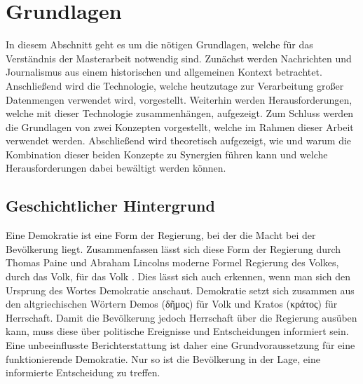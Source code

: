\section{Grundlagen}
In diesem Abschnitt geht es um die nötigen Grundlagen, welche für das Verständnis der Masterarbeit notwendig sind.
Zunächst werden Nachrichten und Journalismus aus einem historischen und allgemeinen Kontext betrachtet.
Anschließend wird die Technologie, welche heutzutage zur Verarbeitung großer Datenmengen verwendet wird, vorgestellt.
Weiterhin werden Herausforderungen, welche mit dieser Technologie zusammenhängen, aufgezeigt.
Zum Schluss werden die Grundlagen von zwei Konzepten vorgestellt, welche im Rahmen dieser Arbeit verwendet werden.
Abschließend wird theoretisch aufgezeigt, wie und warum die Kombination dieser beiden Konzepte zu Synergien führen kann und welche Herausforderungen dabei bewältigt werden können.

\subsection{Geschichtlicher Hintergrund}\label{sec:story-background}
Eine Demokratie ist eine Form der Regierung, bei der die Macht bei der Bevölkerung liegt.
Zusammenfassen lässt sich diese Form der Regierung durch Thomas Paine und Abraham Lincolns moderne Formel \glqq Regierung des Volkes, durch das Volk, für das Volk\grqq{} \cite{lincoln}.
Dies lässt sich auch erkennen, wenn man sich den Ursprung des Wortes Demokratie anschaut.
Demokratie setzt sich zusammen aus den altgriechischen Wörtern Demos (\textgreek{δῆμος}) für Volk und Kratos (\textgreek{κράτος}) für Herrschaft.
Damit die Bevölkerung jedoch Herrschaft über die Regierung ausüben kann, muss diese über politische Ereignisse und Entscheidungen informiert sein.
Eine unbeeinflusste Berichterstattung ist daher eine Grundvoraussetzung für eine funktionierende Demokratie.
Nur so ist die Bevölkerung in der Lage, eine informierte Entscheidung zu treffen. \\

